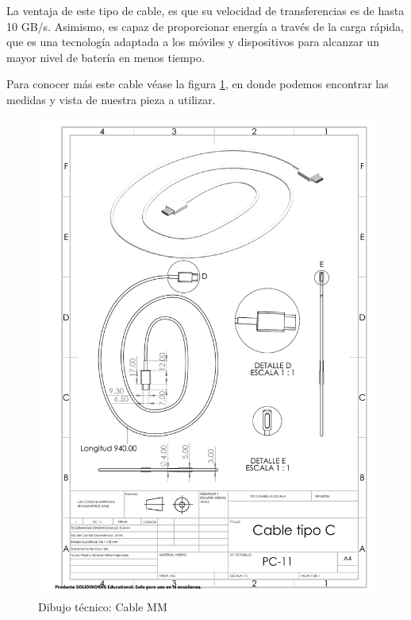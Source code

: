     La ventaja de este tipo de cable, es que su velocidad de transferencias es de hasta 10 GB/s. Asimismo, es capaz de proporcionar energía a través de la carga rápida, que es una tecnología adaptada a los móviles y dispositivos para alcanzar un mayor nivel de batería en menos tiempo.
    
    Para conocer más este cable véase la figura \ref{fig:cableC}, en donde podemos encontrar las medidas y vista de nuestra pieza a utilizar. 
    
    \begin{figure}[H]
        \centering
        \includegraphics[trim = {7mm 1mm 1mm 1mm},clip,scale=0.4]{22/Img/cableCDibujo.PDF}
        \caption{Dibujo técnico: Cable MM}
        \label{fig:cableC}
    \end{figure}
    
    
